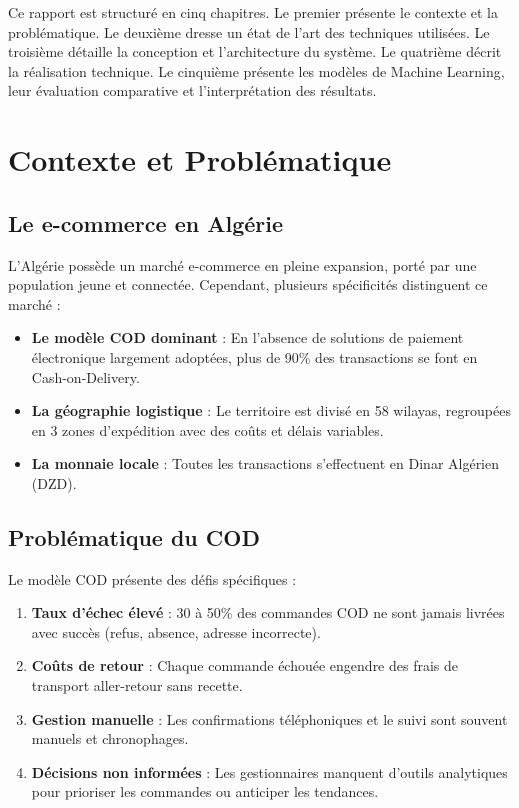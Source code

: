 \documentclass[12pt,a4paper]{report}
\begin{document}
Ce rapport est structur\'{e} en cinq chapitres. Le premier pr\'{e}sente le contexte et la probl\'{e}matique. Le deuxi\`{e}me dresse un \'{e}tat de l'art des techniques utilis\'{e}es. Le troisi\`{e}me d\'{e}taille la conception et l'architecture du syst\`{e}me. Le quatri\`{e}me d\'{e}crit la r\'{e}alisation technique. Le cinqui\`{e}me pr\'{e}sente les mod\`{e}les de Machine Learning, leur \'{e}valuation comparative et l'interpr\'{e}tation des r\'{e}sultats.


\chapter{Contexte et Probl\'{e}matique}

\section{Le e-commerce en Alg\'{e}rie}

L'Alg\'{e}rie poss\`{e}de un march\'{e} e-commerce en pleine expansion, port\'{e} par une population jeune et connect\'{e}e. Cependant, plusieurs sp\'{e}cificit\'{e}s distinguent ce march\'{e} :

\begin{itemize}
  \item \textbf{Le mod\`{e}le COD dominant} : En l'absence de solutions de paiement \'{e}lectronique largement adopt\'{e}es, plus de 90\% des transactions se font en Cash-on-Delivery.
  \item \textbf{La g\'{e}ographie logistique} : Le territoire est divis\'{e} en 58 wilayas, regroup\'{e}es en 3 zones d'exp\'{e}dition avec des co\^{u}ts et d\'{e}lais variables.
  \item \textbf{La monnaie locale} : Toutes les transactions s'effectuent en Dinar Alg\'{e}rien (DZD).
\end{itemize}

\section{Probl\'{e}matique du COD}

Le mod\`{e}le COD pr\'{e}sente des d\'{e}fis sp\'{e}cifiques :

\begin{enumerate}
  \item \textbf{Taux d'\'{e}chec \'{e}lev\'{e}} : 30 \`{a} 50\% des commandes COD ne sont jamais livr\'{e}es avec succ\`{e}s (refus, absence, adresse incorrecte).
  \item \textbf{Co\^{u}ts de retour} : Chaque commande \'{e}chou\'{e}e engendre des frais de transport aller-retour sans recette.
  \item \textbf{Gestion manuelle} : Les confirmations t\'{e}l\'{e}phoniques et le suivi sont souvent manuels et chronophages.
  \item \textbf{D\'{e}cisions non inform\'{e}es} : Les gestionnaires manquent d'outils analytiques pour prioriser les commandes ou anticiper les tendances.
\end{enumerate}
\end{document}
